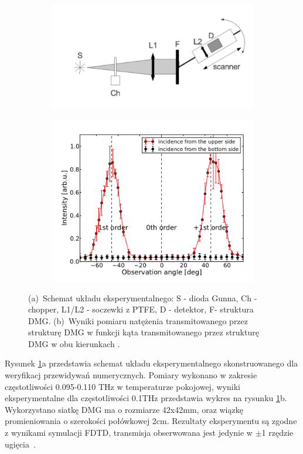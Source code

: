 \begin{figure}
	\begin{subfigure}{0.5\textwidth}
		\includegraphics[width=\textwidth]{images/thz/exp-schem.png}
		\caption{}
	\end{subfigure}
	\begin{subfigure}{0.5\textwidth}
		\centering
		\includegraphics[width=\textwidth]{images/thz/opt-lett-exp.png}
		\caption{}
	\end{subfigure}
	\caption{(a)~Schemat układu eksperymentalnego: S - dioda Gunna, Ch - chopper, L1/L2 - soczewki z PTFE, D - detektor, F- struktura DMG. (b)~Wyniki pomiaru natężenia transmitowanego przez strukturę DMG w funkcji kąta transmitowanego przez strukturę DMG w obu kierunkach \cite{Stolarek:13}.}
	\label{fig:thz-eksp}
\end{figure}

Rysunek \ref{fig:thz-eksp}a przedstawia schemat układu eksperymentalnego skonstruowanego dla weryfikacj przewidywań numerycznych. Pomiary wykonano w zakresie częstotliwości 0.095-0.110 THz w temperaturze pokojowej, wyniki eksperymentalne dla częstotliwości 0.1THz przedstawia wykres na rysunku \ref{fig:thz-eksp}b. Wykorzystano siatkę DMG ma o rozmiarze 42x42mm, oraz wiązkę promieniowania o szerokości połówkowej 2cm. Rezultaty eksperymentu są zgodne z wynikami symulacji FDTD, transmisja obserwowana jest jedynie w $\pm$1 rzędzie ugięcia~\cite{Stolarek:13}. 

